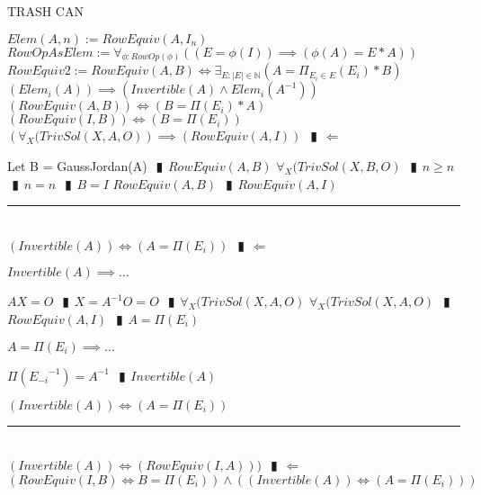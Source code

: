 \documentclass{book}
\newcommand{\abr}{:=}
\newcommand{\pipe}{$\phantom{(}\vrectangleblack\phantom{)}$}
\newcommand{\pr}[1]{\left(#1\right)}
\begin{document}
TRASH CAN

$Elem(A, n) \abr RowEquiv(A, I_n)$ \\
$RowOpAsElem \abr \forall_{\phi : RowOp(\phi)}\pr{\pr{E = \phi(I)} \implies \pr{\phi(A) = E * A}}$ \\
$RowEquiv2 \abr RowEquiv(A, B) \iff \exists_{E : |E| \in \mathbb{N}}\pr{A = \Pi_{E_i \in E}(E_i) * B}$ \\
$\pr{Elem_i(A)} \implies \pr{Invertible(A) \land Elem_i(A^{-1})}$ \\
$\pr{RowEquiv(A, B)} \iff \pr{B = \Pi(E_i) * A}$ \\
$\pr{RowEquiv(I, B)} \iff \pr{B = \Pi(E_i)}$ \\



$\pr{\forall_{X}(TrivSol(X, A, O)} \implies \pr{RowEquiv(A, I)}$ \pipe $\Leftarrow$
\begin{enumerate}
  \lit Let B = GaussJordan(A) \pipe $RowEquiv(A, B)$ 
  \lit $\forall_{X}(TrivSol(X, B, O)$ \pipe $n \geq n$ \pipe $n = n$ \pipe $B = I$
  \lit $RowEquiv(A, B)$ \pipe $RowEquiv(A, I)$ 
\end{enumerate} \vspace{.75mm} \hrule \vspace{.75mm} \ \\ 

$\pr{Invertible(A)} \iff \pr{A = \Pi(E_i)}$ \pipe $\Leftarrow$
\begin{enumerate}
  \lit $Invertible(A) \implies \ldots$
  \begin{enumerate}
    \lit $A X = O$ \pipe $X = A^{-1} O = O$ \pipe $\forall_{X}(TrivSol(X, A, O)$
    \lit $\forall_{X}(TrivSol(X, A, O)$ \pipe $RowEquiv(A, I)$ \pipe $A = \Pi(E_i)$
  \end{enumerate}
  \lit $A = \Pi(E_i) \implies \ldots$
  \begin{enumerate}
    \lit $\Pi({E_{-i}}^{-1}) = A^{-1}$ \pipe $Invertible(A)$
  \end{enumerate}
  \lit $\pr{Invertible(A)} \iff \pr{A = \Pi(E_i)}$
\end{enumerate} \vspace{.75mm} \hrule \vspace{.75mm} \ \\ 

$\pr{Invertible(A)} \iff \pr{RowEquiv(I, A)})$ \pipe $\Leftarrow$ $\pr{RowEquiv(I, B) \iff B = \Pi(E_i)} \land \pr{\pr{Invertible(A)} \iff \pr{A = \Pi(E_i)}}$ \\
\end{document}
